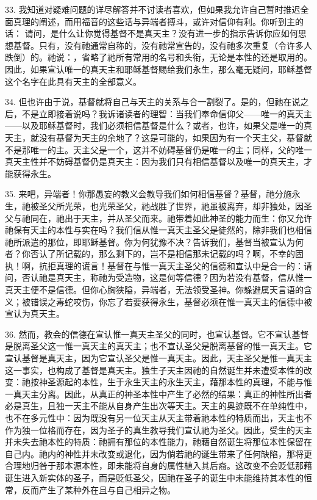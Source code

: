 33. 我知道对疑难问题的详尽解答并不讨读者喜欢，但如果我允许自己暂时推迟全面真理的阐述，而用福音的这些话与异端者搏斗，或许对信仰有利。你听到主的话： 请问，是什么让你觉得基督不是真天主？没有进一步的指示告诉你应如何思想基督。只有，没有祂通常自称的，没有祂常宣告的，没有祂多次重复（令许多人跌倒）的。祂说：，省略了祂所有常用的名号和头衔，无论是本性的还是取用的。因此，如果宣认唯一的真天主和耶稣基督赐给我们永生，那么毫无疑问，耶稣基督这个名字在此具有天主的全部意义。\par

34. 但也许由于说，基督就将自己与天主的关系与合一割裂了。是的，但祂在说之后，不是立即接着说吗？我诉诸读者的理智：当我们奉命信仰父——唯一的真天主——以及耶稣基督时，我们必须相信基督是什么？或者，也许，如果父是唯一的真天主，就没有基督为天主的余地了？这是可能的，如果因为有一个天主父，基督就不是那唯一的主。天主父是一个，这并不妨碍基督仍是唯一的主；同样，父的唯一真天主性并不妨碍基督仍是真天主：因为我们只有相信基督以及唯一的真天主，才能获得永生。\par

35. 来吧，异端者！你那愚妄的教义会教导我们如何相信基督？基督，祂分施永生，祂被圣父所光荣，也光荣圣父，祂战胜了世界，祂虽被离弃，却非独处，因圣父与祂同在，祂出于天主，并从圣父而来。祂带着如此神圣的能力而生：你又允许祂保有天主的本性与实在吗？我们信从惟一真天主圣父是徒然的，除非我们也相信祂所派遣的那位，即耶稣基督。你为何犹豫不决？告诉我们，基督当被宣认为何者？你否认了所记载的，那么剩下的，岂不是相信那未记载的吗？啊，不幸的固执！啊，抗拒真理的谎言！基督在与惟一真天主圣父的信德和宣认中是合一的：请问，否认祂是真天主，称祂为受造物，这是何等信德？因为若没有基督，信从惟一真天主便不是信德。但你心胸狭隘，异端者，无法领受圣神。你躲避属天言语的含义；被错误之毒蛇咬伤，你忘了若要获得永生，基督必须在惟一真天主的信德中被宣认为真天主。\par

36. 然而，教会的信德在宣认惟一真天主圣父的同时，也宣认基督。它不宣认基督是脱离圣父这一惟一真天主的真天主；也不宣认圣父是脱离基督的惟一真天主。它宣认基督是真天主，因为它宣认圣父是惟一真天主。因此，天主圣父是惟一真天主这一事实，也构成了基督是真天主。独生子天主因祂的自然诞生并未遭受本性的改变：祂按神圣源起的本性，生于永生天主的永生天主，藉那本性的真理，不能与惟一真天主分离。因此，从真正的神圣本性中产生了必然的结果：真正的神性所出者必是真生，且独一天主不能从自身产生出次等天主。天主的奥迹既不在单纯性中，也不在多元性中：因为既没有另一位天主从天主带着祂本性的特质而出，天主也不作为独一位格而存在，因为圣子的真生教导我们宣认祂为圣父。因此，受生的天主并未失去祂本性的特质：祂拥有那位的本性能力，祂藉自然诞生将那位本性保留在自己内。祂内的神性并未改变或退化，因为倘若祂的诞生带来了任何缺陷，那将更合理地归咎于那本源本性，即未能将自身的属性植入其后裔。这改变不会贬低那藉诞生进入新实体的圣子，而是贬低圣父，因祂在圣子的诞生中未能维持其本性的恒常，反而产生了某种外在且与自己相异之物。\par

